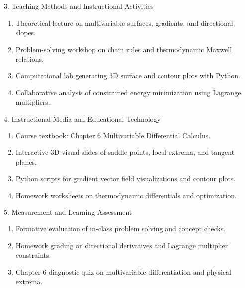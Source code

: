 \newpage

\begin{planbox}[colframe=rbruNavy!85!black, colbacktitle=rbruNavy!85!black]{3. Teaching Methods and Instructional Activities}
\begin{enumerate}[topsep=2pt, itemsep=1pt, partopsep=0pt, parsep=0pt, leftmargin=1.5em]
    \item Theoretical lecture on multivariable surfaces, gradients, and directional slopes.
    \item Problem-solving workshop on chain rules and thermodynamic Maxwell relations.
    \item Computational lab generating 3D surface and contour plots with Python.
    \item Collaborative analysis of constrained energy minimization using Lagrange multipliers.
\end{enumerate}
\end{planbox}

\begin{planbox}[colframe=rbruGold!90!black, colbacktitle=rbruGold!90!black]{4. Instructional Media and Educational Technology}
\begin{enumerate}[topsep=2pt, itemsep=1pt, partopsep=0pt, parsep=0pt, leftmargin=1.5em]
    \item Course textbook: Chapter 6 Multivariable Differential Calculus.
    \item Interactive 3D visual slides of saddle points, local extrema, and tangent planes.
    \item Python scripts for gradient vector field visualizations and contour plots.
    \item Homework worksheets on thermodynamic differentials and optimization.
\end{enumerate}
\end{planbox}

\begin{planbox}[colframe=rbruSlate, colbacktitle=rbruSlate]{5. Measurement and Learning Assessment}
\begin{enumerate}[topsep=2pt, itemsep=1pt, partopsep=0pt, parsep=0pt, leftmargin=1.5em]
    \item Formative evaluation of in-class problem solving and concept checks.
    \item Homework grading on directional derivatives and Lagrange multiplier constraints.
    \item Chapter 6 diagnostic quiz on multivariable differentiation and physical extrema.
\end{enumerate}
\end{planbox}
\clearpage

